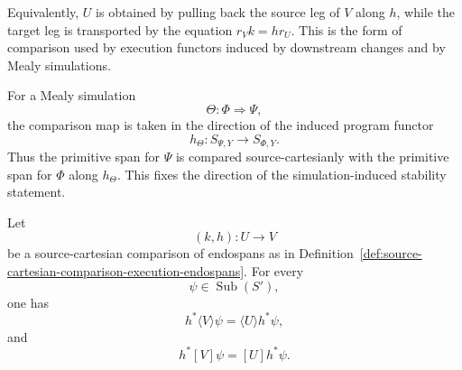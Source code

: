Equivalently, \(U\) is obtained by pulling back the source leg of \(V\) along
\(h\), while the target leg is transported by the equation \(r_Vk=hr_U\).
This is the form of comparison used by execution functors induced by
downstream changes and by Mealy simulations.

For a Mealy simulation
\[
  \Theta:\Phi\Rightarrow\Psi,
\]
the comparison map is taken in the direction of the induced program functor
\[
  h_\Theta:S_{\Psi,Y}\to S_{\Phi,Y}.
\]
Thus the primitive span for \(\Psi\) is compared source-cartesianly with the
primitive span for \(\Phi\) along \(h_\Theta\). This fixes the direction of
the simulation-induced stability statement.

\begin{lemma}
\label{lem:primitive-source-cartesian-modal-stability}
Let
\[
  (k,h):U\to V
\]
be a source-cartesian comparison of endospans as in
Definition~\ref{def:source-cartesian-comparison-execution-endospans}. For
every
\[
  \psi\in\operatorname{Sub}(S'),
\]
one has
\[
  h^\ast\langle V\rangle\psi
  =
  \langle U\rangle h^\ast\psi,
\]
and
\[
  h^\ast[V]\psi
  =
  [U]h^\ast\psi.
\]
\end{lemma}

